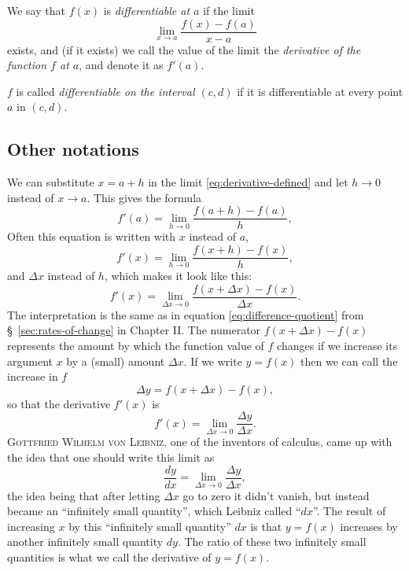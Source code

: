 We say that $f(x)$ is \emph{differentiable at $a$} if the limit
\begin{equation}\label{eq:derivative-defined}
  \lim_{x\to a} \frac{f(x)-f(a)}{x-a}
\end{equation}
exists, and (if it exists) we call the value of the limit the \emph{derivative
of the function $f$ at $a$}, and denote it as $f'(a)$.




\noindent
$f$ is called \emph{differentiable on the interval $(c, d)$} if it is
differentiable at every point $a$ in $(c,d)$.




\upshape




\subsection{Other notations}\label{sec:other-notations} 
We can substitute $x=a+h$ in the limit \eqref{eq:derivative-defined}
and let $h\to0$ instead of $x\to a$.  This gives the formula
\begin{equation}\label{eq:derivative-defined-a-plus-h}
  f'(a) = \lim_{h\to 0} \frac{f(a+h)-f(a)}{h},
\end{equation}
Often this equation is written with $x$ instead of $a$,
\begin{equation}\label{eq:derivative-defined-x-plus-h}
  f'(x) = \lim_{h\to 0} \frac{f(x+h)-f(x)}{h},
\end{equation}
and $\Delta x$ instead of $h$, which makes it look like this:
\begin{equation}\label{eq:derivative-defined-x-plus-Dx}
f'(x) = \lim_{\Delta x\to0} \frac{f(x+\Delta x) - f(x)}{\Delta x}.
\end{equation}
The interpretation is the same as in equation \eqref{eq:difference-quotient}
from \S~\ref{sec:rates-of-change} in Chapter II.  The numerator $f(x+\Delta x) -
f(x)$ represents the amount by which the function value of $f$ changes if we
increase its argument $x$ by a (small) amount $\Delta x$.  If we write $y=f(x)$
then we can call the increase in $f$
\[
\Delta y = f(x+\Delta x) - f(x),
\]
so that the derivative $f'(x)$ is
\[
f'(x) = \lim_{\Delta x\to0}\frac{\Delta y}{\Delta x}.
\]
\textsc{Gottfried Wilhelm von Leibniz}, one of the inventors of calculus,
came up with the idea that one should write this limit as
\[
\frac{dy}{dx}= \lim_{\Delta x\to0}\frac{\Delta y}{\Delta x},
\]
the idea being that after letting $\Delta x$ go to zero it didn't vanish,
but instead became an ``infinitely small quantity'', which Leibniz called
``$dx$''.  The result of increasing $x$ by this ``infinitely small quantity''
$dx$ is that $y=f(x)$ increases by another infinitely small quantity $dy$.
The ratio of these two infinitely small quantities is what we call the
derivative of $y=f(x)$.




